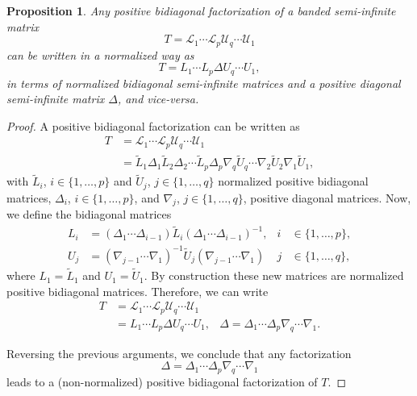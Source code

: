 \documentclass[11pt]{amsart}
\theoremstyle{plain}
\newtheorem{pro}[teo]{Proposition}
\newcommand{\1}{\text{\fontseries{bx}\selectfont \textup 1}}
\begin{document}
\begin{pro}
	Any positive bidiagonal factorization of a banded semi-infinite matrix
	\[
	T=\mathscr L_1\cdots \mathscr L_p \mathscr U_q\cdots \mathscr U_1
	\]
	can be written in a normalized way as
	\[
	T=L_1   \cdots  L_p\Delta  U_q\cdots   U_1,
	\]
	in terms of normalized bidiagonal semi-infinite matrices and a positive diagonal semi-infinite matrix $\Delta$, and vice-versa.
\end{pro}



\begin{proof}
	A positive bidiagonal factorization can be written as
	\[
	\begin{aligned}
		T&=\mathscr L_1\cdots \mathscr L_p \mathscr U_q\cdots \mathscr U_1\\&=
		\tilde L_1 \Delta_1 \tilde L_2 \Delta_2\cdots \tilde L_p\Delta_p\nabla_q \tilde U_q\cdots \nabla_2\tilde U_2\nabla_1 \tilde U_1,
	\end{aligned}
	\]
	with $\tilde L_i$, $i\in\{1,\dots,p\}$ and $\tilde U_j$, $j\in\{1,\dots,q\}$ normalized positive bidiagonal matrices, $\Delta_i$, $i\in\{1,\dots,p\}$, and $\nabla_j$, $j\in\{1,\dots,q\}$, positive diagonal matrices.
	Now, we define the bidiagonal matrices
	\[
	\begin{aligned}
		L_i &= (\Delta_1\cdots \Delta_{i-1})\tilde L_i (\Delta_1\cdots \Delta_{i-1})^{-1}, &i&\in\{1,\dots,p\},\\
		U_j &= (\nabla_{j-1}\cdots \nabla_1)^{-1}\tilde U_j (\nabla_{j-1}\cdots \nabla_1)  &j&\in\{1,\dots,q\},
	\end{aligned}
	\]
	where $L_1=\tilde L_1$ and $U_1=\tilde U_1$. By construction these new matrices are normalized positive bidiagonal matrices. Therefore, we can write
	\[
	\begin{aligned}
		T&=\mathscr L_1\cdots \mathscr L_p \mathscr U_q\cdots \mathscr U_1\\&=
		L_1   \cdots  L_p\Delta  U_q\cdots   U_1, & \Delta= \Delta_1\cdots \Delta_p\nabla_q\cdots\nabla_1.
	\end{aligned}
	\]
	
	Reversing the previous arguments, we conclude that any factorization
	\[
	\Delta= \Delta_1\cdots \Delta_p\nabla_q\cdots\nabla_1
	\]
	leads to a (non-normalized) positive bidiagonal factorization of $T$.
\end{proof}
\end{document}
